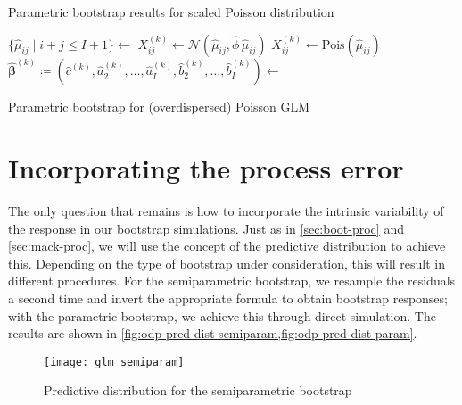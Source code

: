 \documentclass[a4paper]{book}
\begin{document}
\begin{table}[!htb]
  \centering
  
  \caption{Parametric bootstrap results for scaled Poisson distribution}
  \label{tab:odp-param-pois}
\end{table}

\begin{algorithm}
  \begin{algorithmic}
    \State $\{\widehat{\mu}_{ij} \mid i + j \leq I + 1 \} \gets$ 
            \State $X_{ij}^{(k)} \gets \mathcal{N}(\widehat{\mu}_{ij}, \widehat{\phi} \, \widehat{\mu}_{ij})$
          \Else
            \State $X_{ij}^{(k)} \gets \mathrm{Pois}(\widehat{\mu}_{ij})$
          \EndIf
        \EndFor
      \EndFor
      \State $\widehat{\bm{\beta}}^{(k)} \coloneqq (\widehat{c}^{(k)}, \widehat{a}_2^{(k)}, \dots, \widehat{a}_I^{(k)}, \widehat{b}_2^{(k)}, \dots, \widehat{b}_I^{(k)}) \gets$ 
    \EndFor
    \State {}
  \end{algorithmic}
  \caption{Parametric bootstrap for (overdispersed) Poisson GLM}
  \label{alg:param-pois}
\end{algorithm}

\section{Incorporating the process error}

The only question that remains is how to incorporate the intrinsic variability of the response in our bootstrap simulations. Just as in \cref{sec:boot-proc} and \cref{sec:mack-proc}, we will use the concept of the predictive distribution to achieve this. Depending on the type of bootstrap under consideration, this will result in different procedures. For the semiparametric bootstrap, we resample the residuals a second time and invert the appropriate formula to obtain bootstrap responses; with the parametric bootstrap, we achieve this through direct simulation. The results are shown in \cref{fig:odp-pred-dist-semiparam,fig:odp-pred-dist-param}.

\begin{figure}[!p]
  \texttt{[image: glm\_semiparam]}
  \caption{Predictive distribution for the semiparametric bootstrap}
  \label{fig:odp-pred-dist-semiparam}
\end{figure}
\end{document}
